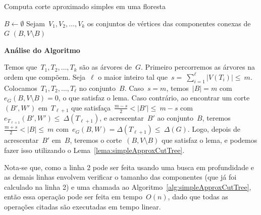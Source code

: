 \documentclass[a4paper,12pt]{article}
\begin{document}
\begin{algorithm}[H]
\label{alg:simpleApproxCutForest}

	\caption{Computa corte aproximado simples em uma floresta}
	$B \gets \emptyset$\;
	Sejam~$V_1, V_2,\ldots, V_k$ os conjuntos de vértices das
	componentes conexas de~$G$\;
	\Return $(B,V\setminus B)$\;

\end{algorithm}	

\bigskip
\bigskip
\bigskip

\textbf{Análise do Algoritmo}

	Temos que~$T_1, T_2, \ldots,T_k$ são 
	as árvores de~$G$. 
	Primeiro percorremos as árvores na ordem que compõem. 
	Seja~$\ell$ o maior inteiro tal 
	que~$s=~\displaystyle\sum_{i=1}^{\ell}|V(T_i)| \le~m$.
	Colocamos~$T_1,T_2, \ldots,T_\ell$ no conjunto~$B$.
	Caso~$s=m$, temos~$|B|=m$ com~$e_G(B,V\setminus B)=0$, o que satisfaz o lema.
	Caso contrário, ao encontrar um corte~$(B',W')$ em~$T_{\ell+1}$ que
	satisfaça~$\frac{m-s}{2}<|B'|\le~m-s$ com~$e_{T_{\ell+1}}(B',W') \le~
	\Delta(T_{\ell+1})$, e acrescentar~$B'$ ao conjunto~$B$, 
	teremos~$\frac{m+s}{2}<|B| \le~m$ 
	com~$e_G(B,W)=\Delta(T_{\ell+1}) \le~\Delta(G)$.
	Logo, depois de acrescentar~$B'$ em~$B$, teremos o corte~$(B,V\setminus B)$
	que satisfaz o lema, e podemos fazer isso utilizando o 
	Lema~\ref{lema:simpleApproxCutTree}.
	
	Nota-se que, como a linha 2 pode ser feita usando uma
	busca em profundidade e as demais 
	linhas envolvem verificar o tamanho das componentes 
	(que já foi calculado na linha 2) e uma chamada ao
	Algoritmo~\ref{alg:simpleApproxCutTree}, então essa operação pode 
	ser feita em tempo~$O(n)$, dado que todas as operações
	citadas são executadas em tempo linear. 

\bigskip
\bigskip
\bigskip


\end{document}
